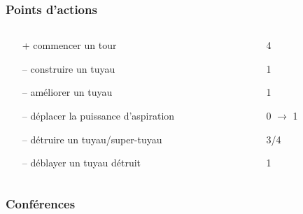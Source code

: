 \documentclass{beamer}
\begin{document}
\begin{frame}
	\frametitle{Points d'actions}
	\begin{columns}[T]
        \begin{column}{.65\textwidth}
            \begin{itemize}
	            \item[+] commencer un tour
	            \item[\alert{--}] construire un tuyau
	            \item[\alert{--}] améliorer un tuyau
	            \item[\alert{--}] déplacer la puissance d'aspiration
	            \item[\alert{--}] détruire un tuyau/super-tuyau
	            \item[\alert{--}] déblayer un tuyau détruit
	        \end{itemize}
        \end{column}
        \begin{column}{.35\textwidth}
            \begin{itemize}
                \item[] 4
	            \item[] 1
	            \item[] 1
	            \item[] 0 $\rightarrow$ 1
	            \item[] 3/4
	            \item[] 1
            \end{itemize}
        \end{column}
    \end{columns}
\end{frame}

\begin{frame}
    \frametitle{Conférences}
\end{frame}
\end{document}
